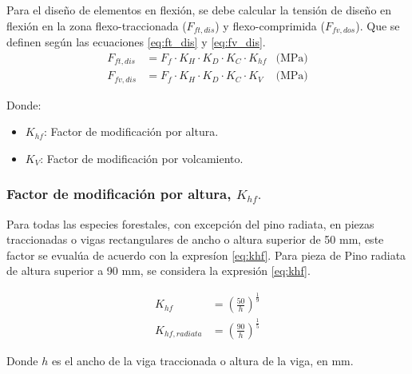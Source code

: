 Para el diseño de elementos en flexión, se debe calcular la tensión de diseño en flexión en la zona flexo-traccionada ($F_{ft,dis}$) y flexo-comprimida ($F_{fv,dos}$). Que se definen según las ecuaciones \ref{eq:ft_dis} y \ref{eq:fv_dis}.
\begin{subequations}
\begin{align}
	F_{ft,dis}&=F_f \cdot K_H \cdot K_D \cdot K_C \cdot K_{hf} &\text{(MPa)} \label{eq:ft_dis}\\	
	F_{fv,dis}&=F_f \cdot K_H \cdot K_D \cdot K_C \cdot K_V &\text{(MPa)}	 \label{eq:fv_dis}
\end{align}
\end{subequations}

Donde:
\begin{itemize}
	\item[] $K_{hf}$: Factor de modificación por altura.
	\item[] $K_V$: Factor de modificación por volcamiento.
\end{itemize}

\subsubsection{Factor de modificación por altura, $K_{hf}.$}
Para todas las especies forestales, con excepción del pino radiata, en piezas traccionadas o vigas rectangulares de ancho o altura superior de 50 mm, este factor se evualúa de acuerdo con la expresíon \ref{eq:khf}. Para pieza de Pino radiata de altura superior a 90 mm, se considera la expresión \ref{eq:khf}.

\begin{subequations}
\begin{align}
	K_{hf}&=\left(\frac{50}{h}\right)^{\frac{1}{9}} \label{eq:khf}\\
	K_{hf,radiata}&=\left(\frac{90}{h}\right)^{\frac{1}{5}} \label{eq:khfr}
\end{align}
\end{subequations}

Donde $h$ es el ancho de la viga traccionada o altura de la viga, en mm.

